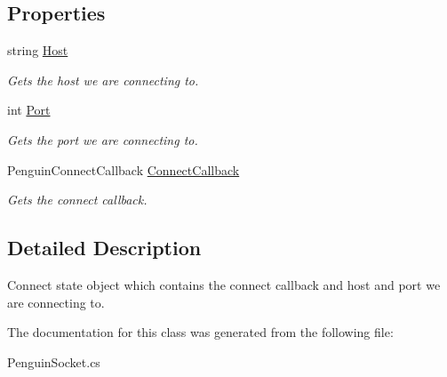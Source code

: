 \subsection*{Properties}
\begin{DoxyCompactItemize}
\item 
\hypertarget{classSharpenguin_1_1Net_1_1ConnectState_a28170c1d4e125075312a3b0f17223518}{string \hyperlink{classSharpenguin_1_1Net_1_1ConnectState_a28170c1d4e125075312a3b0f17223518}{Host}}\label{classSharpenguin_1_1Net_1_1ConnectState_a28170c1d4e125075312a3b0f17223518}

\begin{DoxyCompactList}\small\item\em Gets the host we are connecting to. \end{DoxyCompactList}\item 
\hypertarget{classSharpenguin_1_1Net_1_1ConnectState_a199d4c0f3167633735800044e5f02f76}{int \hyperlink{classSharpenguin_1_1Net_1_1ConnectState_a199d4c0f3167633735800044e5f02f76}{Port}}\label{classSharpenguin_1_1Net_1_1ConnectState_a199d4c0f3167633735800044e5f02f76}

\begin{DoxyCompactList}\small\item\em Gets the port we are connecting to. \end{DoxyCompactList}\item 
\hypertarget{classSharpenguin_1_1Net_1_1ConnectState_a984f995be32791ec8f4a83d9efd0a292}{Penguin\-Connect\-Callback \hyperlink{classSharpenguin_1_1Net_1_1ConnectState_a984f995be32791ec8f4a83d9efd0a292}{Connect\-Callback}}\label{classSharpenguin_1_1Net_1_1ConnectState_a984f995be32791ec8f4a83d9efd0a292}

\begin{DoxyCompactList}\small\item\em Gets the connect callback. \end{DoxyCompactList}\end{DoxyCompactItemize}


\subsection{Detailed Description}
Connect state object which contains the connect callback and host and port we are connecting to. 

The documentation for this class was generated from the following file\-:\begin{DoxyCompactItemize}
\item 
Penguin\-Socket.\-cs\end{DoxyCompactItemize}
